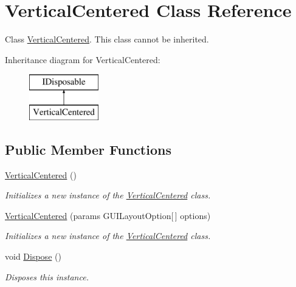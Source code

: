 \hypertarget{class_vertical_centered}{}\section{Vertical\+Centered Class Reference}
\label{class_vertical_centered}


Class \hyperlink{class_vertical_centered}{Vertical\+Centered}. This class cannot be inherited.  


Inheritance diagram for Vertical\+Centered\+:\begin{figure}[H]
\begin{center}
\leavevmode
\includegraphics[height=2.000000cm]{class_vertical_centered}
\end{center}
\end{figure}
\subsection*{Public Member Functions}
\begin{DoxyCompactItemize}
\item 
\hyperlink{class_vertical_centered_a01ae1291cf33dce502e25a2664ba1373}{Vertical\+Centered} ()
\begin{DoxyCompactList}\small\item\em Initializes a new instance of the \hyperlink{class_vertical_centered}{Vertical\+Centered} class. \end{DoxyCompactList}\item 
\hyperlink{class_vertical_centered_abe07e0a533721ac8d5675297eeec1a28}{Vertical\+Centered} (params G\+U\+I\+Layout\+Option\mbox{[}$\,$\mbox{]} options)
\begin{DoxyCompactList}\small\item\em Initializes a new instance of the \hyperlink{class_vertical_centered}{Vertical\+Centered} class. \end{DoxyCompactList}\item 
void \hyperlink{class_vertical_centered_a705b958f5fe1f45e3aca234daa1be378}{Dispose} ()
\begin{DoxyCompactList}\small\item\em Disposes this instance. \end{DoxyCompactList}\end{DoxyCompactItemize}


